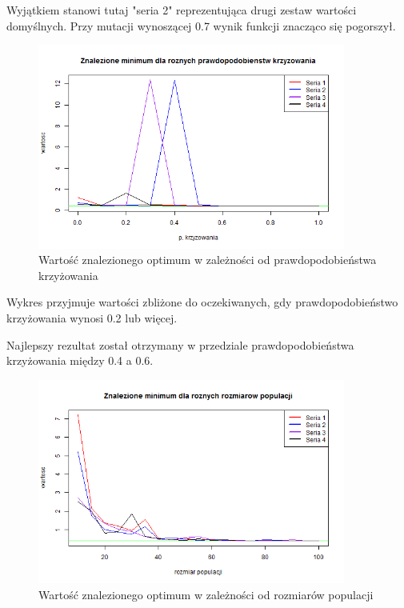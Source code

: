 \documentclass[11pt, a4paper]{article}
\newcommand{\fbi}{\leavevmode{\parindent=1em\indent}}
\begin{document}
\fbi
Wyjątkiem stanowi tutaj "seria 2" reprezentująca drugi zestaw wartości domyślnych. Przy mutacji wynoszącej 0.7 wynik funkcji znacząco się pogorszył.


\begin{figure}[H]
	\centering
	\includegraphics[width=0.9\textwidth]{./assets/Branin3.png} %
	\caption{Wartość znalezionego optimum w zależności od prawdopodobieństwa krzyżowania}
	\label{fig:branin3}
\end{figure}

\fbi
Wykres przyjmuje wartości zbliżone do oczekiwanych, gdy prawdopodobieństwo krzyżowania wynosi 0.2 lub więcej.

\fbi
Najlepszy rezultat został otrzymany w przedziale prawdopodobieństwa krzyżowania między 0.4 a 0.6.


\begin{figure}[H]
	\centering
	\includegraphics[width=0.9\textwidth]{./assets/Branin4.png} %
	\caption{Wartość znalezionego optimum w zależności od rozmiarów populacji}
	\label{fig:branin4}
\end{figure}
\end{document}
